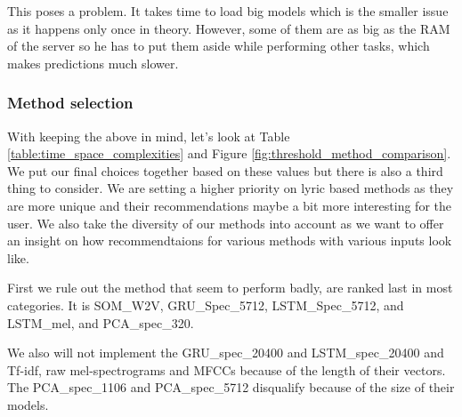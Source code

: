 This poses a problem. It takes time to load big models which is the smaller issue as it happens only once in theory. However, some of them are as big as the RAM of the server so he has to put them aside while performing other tasks, which makes predictions much slower.

\subsubsection{Method selection}\label{ssec:method_selection}

With keeping the above in mind, let's look at Table \ref{table:time_space_complexities} and Figure \ref{fig:threshold_method_comparison}. We put our final choices together based on these values but there is also a third thing to consider. We are setting a higher priority on lyric based methods as they are more unique and their recommendations maybe a bit more interesting for the user. We also take the diversity of our methods into account as we want to offer an insight on how recommendtaions for various methods with various inputs look like. 

First we rule out the method that seem to perform badly, are ranked last in most categories. It is SOM\_W2V, GRU\_Spec\_5712, LSTM\_Spec\_5712, and LSTM\_mel, and PCA\_spec\_320. 

We also will not implement the GRU\_spec\_20400 and LSTM\_spec\_20400 and Tf-idf, raw mel-spectrograms and MFCCs because of the length of their vectors. The PCA\_spec\_1106 and PCA\_spec\_5712 disqualify because of the size of their models. 

